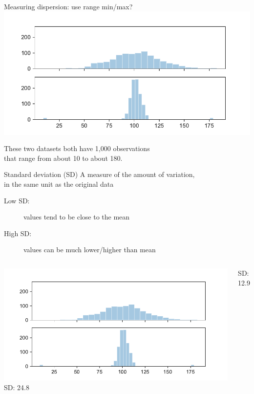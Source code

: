 \documentclass[aspectratio=169,usenames,dvipsnames]{beamer}
\begin{document}
\begin{frame}{Measuring dispersion: use range min/max?}
\includegraphics[width=\textwidth]{fig/disp.pdf}

These two datasets both have 1,000 observations \\
that range from about 10 to about 180.
\end{frame}


\begin{frame}{Standard deviation (SD)}
A measure of the amount of variation,\\
in the same unit as the original data

\begin{description}
    \item[Low SD:] values tend to be close to the mean
    \item[High SD:] values can be much lower/higher than mean
\end{description}

\pause
    \begin{columns}[T]
            \includegraphics[width=\textwidth]{fig/disp.pdf}
            \vspace{3em}
            SD: 24.8

            \vspace{4em}
            SD: 12.9
    \end{columns}
\end{frame}
\end{document}
